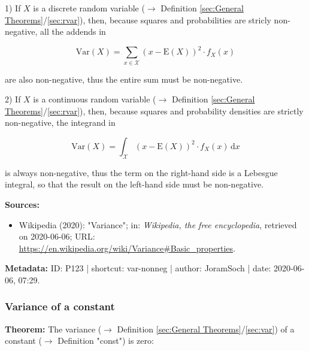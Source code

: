 \documentclass[a4paper,12pt,twoside]{book}
\begin{document}
\vspace{1em}
1) If $X$ is a discrete random variable ($\rightarrow$ Definition \ref{sec:General Theorems}/\ref{sec:rvar}), then, because squares and probabilities are stricly non-negative, all the addends in

\begin{equation} \label{eq:var-nonneg-var-disc}
\mathrm{Var}(X) = \sum_{x \in \mathcal{X}} (x-\mathrm{E}(X))^2 \cdot f_X(x)
\end{equation}

are also non-negative, thus the entire sum must be non-negative.

\vspace{1em}
2) If $X$ is a continuous random variable ($\rightarrow$ Definition \ref{sec:General Theorems}/\ref{sec:rvar}), then, because squares and probability densities are strictly non-negative, the integrand in

\begin{equation} \label{eq:var-nonneg-var-cont}
\mathrm{Var}(X) = \int_{\mathcal{X}} (x-\mathrm{E}(X))^2 \cdot f_X(x) \, \mathrm{d}x
\end{equation}

is always non-negative, thus the term on the right-hand side is a Lebesgue integral, so that the result on the left-hand side must be non-negative.


\vspace{1em}
\textbf{Sources:}
\begin{itemize}
\item Wikipedia (2020): "Variance"; in: \textit{Wikipedia, the free encyclopedia}, retrieved on 2020-06-06; URL: \url{https://en.wikipedia.org/wiki/Variance#Basic_properties}.
\end{itemize}


\vspace{1em}
\textbf{Metadata:} ID: P123 | shortcut: var-nonneg | author: JoramSoch | date: 2020-06-06, 07:29.
\vspace{1em}



\subsubsection[\textbf{Variance of a constant}]{Variance of a constant} \label{sec:var-const}
\setcounter{equation}{0}

\textbf{Theorem:} The variance ($\rightarrow$ Definition \ref{sec:General Theorems}/\ref{sec:var}) of a constant ($\rightarrow$ Definition "const") is zero:
\end{document}
